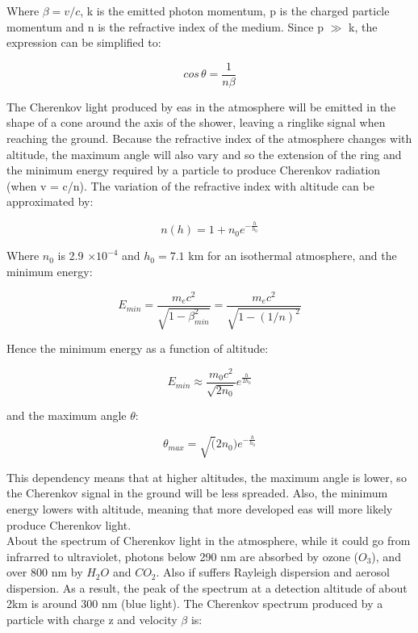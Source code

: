\documentclass[main.tex]{subfiles}
\begin{document}
Where $\beta = v/c$, k is the emitted photon momentum, p is the charged particle momentum and n is the refractive index of the medium. Since p $\gg$ k, the expression can be simplified to:

\begin{equation}
    cos\,\theta = \frac{1}{n\beta}
\end{equation}

The Cherenkov light produced by \gls{eas} in the atmosphere will be emitted in the shape of a cone around the axis of the shower, leaving a ringlike signal when reaching the ground. Because the refractive index of the atmosphere changes with altitude, the maximum angle will also vary and so the extension of the ring and the minimum energy required by a particle to produce Cherenkov radiation (when v = c/n).
The variation of the refractive index with altitude can be approximated by:

\begin{equation}
    n(h) = 1+n_0e^{-\frac{h}{h_0}}
\end{equation}

Where $n_{0}$ is 2.9 $\times 10^{-4}$ and $h_0 = 7.1$ km for an isothermal atmosphere, and the minimum energy:

\begin{equation}
    E_{min} = \frac{m_ec^2}{\sqrt{1-\beta_{min}^2}} = \frac{m_ec^2}{\sqrt{1-(1/n)^2}}
\end{equation}

Hence the minimum energy as a function of altitude:

\begin{equation}
    E_{min} \approx \frac{m_0c^2}{\sqrt{2n_0}}e^{\frac{h}{2h_0}}
\end{equation}

and the maximum angle $\theta$:

\begin{equation}
    \theta_{max} = \sqrt(2n_0)e^{-\frac{h}{h_0}}
\end{equation}

This dependency means that at higher altitudes, the maximum angle is lower, so the Cherenkov signal in the ground will be less spreaded. Also, the minimum energy lowers with altitude, meaning that more developed \gls{eas} will more likely produce Cherenkov light.\\
About the spectrum of Cherenkov light in the atmosphere, while it could go from infrarred to ultraviolet, photons below 290 nm are absorbed by ozone ($O_3$), and over 800 nm by $H_2O$ and $CO_2$. Also if suffers Rayleigh dispersion and aerosol dispersion. As a result, the peak of the spectrum at a detection altitude of about 2km is around 300 nm (blue light). The Cherenkov spectrum produced by a particle with charge z and velocity $\beta$ is:
\end{document}

